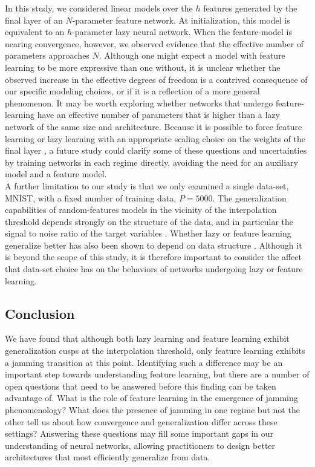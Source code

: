 \documentclass[11pt]{article}
\begin{document}
In this study, we considered linear models over the $h$ features generated by the final layer of an $N$-parameter feature network. At initialization, this model is equivalent to an $h$-parameter lazy neural network. When the feature-model is nearing convergence, however, we observed evidence that the effective number of parameters approaches $N$. Although one might expect a model with feature learning to be more expressive than one without, it is unclear whether the observed increase in the effective degrees of freedom is a contrived consequence of our specific modeling choices, or if it is a reflection of a more general phenomenon. It may be worth exploring whether networks that undergo feature-learning have an effective number of parameters that is higher than a lazy network of the same size and architecture. Because it is possible to force feature learning or lazy learning with an appropriate scaling choice on the weights of the final layer \cite{chizatLazyTrainingDifferentiable2020,geigerDisentanglingFeatureLazy2020}, a future study could clarify some of these questions and uncertainties by training networks in each regime directly, avoiding the need for an auxiliary model and a feature model.\\ 

A further limitation to our study is that we only examined a single data-set, MNIST, with a fixed number of training data, $P=5000$. The generalization capabilities of random-features models in the vicinity of the interpolation threshold depends strongly on the structure of the data, and in particular the signal to noise ratio of the target variables \cite{meiGeneralizationErrorRandom2019}. Whether lazy or feature learning generalize better has also been shown to depend on data structure \cite{geigerDisentanglingFeatureLazy2020}. Although it is beyond the scope of this study, it is therefore important to consider the affect that data-set choice has on the behaviors of networks undergoing lazy or feature learning.

\subsection{Conclusion}

We have found that although both lazy learning and feature learning exhibit generalization cusps at the interpolation threshold, only feature learning exhibits a jamming transition at this point. Identifying such a difference may be an important step towards understanding feature learning, but there are a number of open questions that need to be answered before this finding can be taken advantage of. What is the role of feature learning in the emergence of jamming phenomenology? What does the presence of jamming in one regime but not the other tell us about how convergence and generalization differ across these settings? Answering these questions may fill some important gaps in our understanding of neural networks, allowing practitioners to design better architectures that most efficiently generalize from data. \\
 
\end{document}
